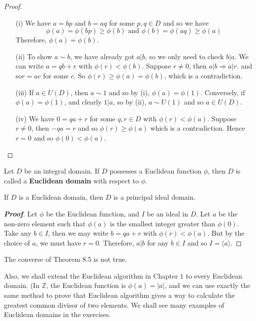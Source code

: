 \begin{proof}
\begin{enumerate}
\item[(i)] We have $a=bp$ and $b=aq$ for some $p,q \in D$ and so we have
$$\phi(a)=\phi(bp) \ge \phi(b) \text{ and }\phi(b)=\phi(aq) \ge \phi(a)$$
   Therefore, $\phi(a)=\phi(b)$.
\item[(ii)] To show $a \sim b$, we have already got $a|b$, so we only need to check $b|a$. We can write $a=qb+r$ with $\phi(r) < \phi(b)$. Suppose $r \neq 0$, then $a|b \Rightarrow a|r$.
    and so$r=ac$ for some $c$. So $\phi(r) \ge \phi(a)=\phi(b)$, which is a contradiction.
\item[(iii)] If $a \in U(D)$, then $a \sim 1$ and so by (i), $\phi(a)=\phi(1)$. Conversely, if $\phi(a)=\phi(1)$, and clearly $1 |a$, so by (ii), $a \sim U(1)$ and so $a \in U(D)$.
\item[(iv)] We have $0=qa+r$ for some $q,r \in D$ with $\phi(r)<\phi(a)$. Suppose $r \neq 0$, then
$-qa=r$ and so $\phi(r) \ge \phi(a)$ which is a contradiction. Hence $r=0$ and so $\phi(0) <\phi(a)$.
\end{enumerate}
\end{proof}
\begin{definition} Let $D$ be an integral domain. If $D$ possesses a Euclidean function $\phi$, then $D$ is called a {\bf Euclidean domain} with respect to $\phi$.
\end{definition}
\begin{theorem} If $D$ is a Euclidean domain, then $D$ is a principal ideal domain.
\end{theorem}
\begin{proof}[\bf Proof] Let $\phi$ be the Euclidean function, and $I$ be an ideal in $D$. Let $a$ be the non-zero element such that $\phi(a)$ is the smallest integer greater than $\phi(0)$. Take any $b \in I$, then we may write $b=qa+r$ with $\phi(r)<\phi(a)$. But by the choice of $a$, we must have $r=0$. Therefore, $a|b$ for any $b \in I$ and so $I=\langle a \rangle$.
\end{proof}
\begin{remark} The converse of Theorem 8.5 is not true.
\end{remark}
Also, we shall extend the Euclidean algorithm in Chapter $1$ to every Euclidean domain. (In $\mathbb{Z}$, the Euclidean function is $\phi(a)=|a|$, and we can use exactly the same method to prove that Euclidean algorithm gives a way to calculate the greatest common divisor of two elements.
We shall see many examples of Euclidean domains in the exercises.
